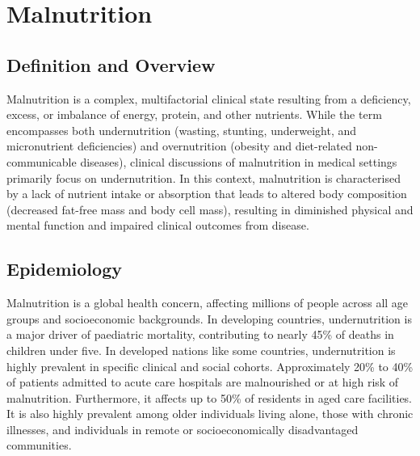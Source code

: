 \chapter{Malnutrition}

\section*{Definition and Overview}
Malnutrition is a complex, multifactorial clinical state resulting from a deficiency, excess, or imbalance of energy, protein, and other nutrients. While the term encompasses both undernutrition (wasting, stunting, underweight, and micronutrient deficiencies) and overnutrition (obesity and diet-related non-communicable diseases), clinical discussions of malnutrition in medical settings primarily focus on undernutrition. In this context, malnutrition is characterised by a lack of nutrient intake or absorption that leads to altered body composition (decreased fat-free mass and body cell mass), resulting in diminished physical and mental function and impaired clinical outcomes from disease.

\section*{Epidemiology}
Malnutrition is a global health concern, affecting millions of people across all age groups and socioeconomic backgrounds. In developing countries, undernutrition is a major driver of paediatric mortality, contributing to nearly 45\% of deaths in children under five. In developed nations like some countries, undernutrition is highly prevalent in specific clinical and social cohorts. Approximately 20\% to 40\% of patients admitted to acute care hospitals are malnourished or at high risk of malnutrition. Furthermore, it affects up to 50\% of residents in aged care facilities. It is also highly prevalent among older individuals living alone, those with chronic illnesses, and individuals in remote or socioeconomically disadvantaged communities.

